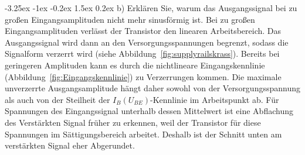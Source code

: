 \documentclass[
	a4paper, %
	12pt, %
]{CSUniSchoolLabReport}
\makeatletter
\renewcommand\paragraph{\@startsection{paragraph}{4}{\z@}%
  {-3.25ex \@plus -1ex \@minus -0.2ex}%
  {1.5ex \@plus 0.2ex}%
  {\normalfont\normalsize\bfseries}}
\makeatother
\begin{document}
\paragraph{b) Erklären Sie, warum das Ausgangssignal bei zu großen Eingangsamplituden nicht mehr sinusförmig ist.}
Bei zu großen Eingangsamplituden verlässt der Transistor den linearen Arbeitsbereich. Das Ausgangssignal wird dann an den Versorgungsspannungen begrenzt, sodass die Signalform verzerrt wird (siehe Abbildung~\ref{fig:supplyrailskrass}). Bereits bei geringeren Amplituden kann es durch die nichtlineare Eingangskennlinie (Abbildung~\ref{fig:Eingangskennlinie}) zu Verzerrungen kommen. Die maximale unverzerrte Ausgangsamplitude hängt daher sowohl von der Versorgungsspannung als auch von der Steilheit der $I_B(U_{BE})$-Kennlinie im Arbeitspunkt ab.  
Für Spannungen des Eingangssignal unterhalb dessen Mittelwert ist eine Abflachung des Verstärkten Signal früher zu erkennen, weil der Transistor für diese Spannungen im Sättigungsbereich arbeitet. Deshalb ist der Schnitt unten am verstärkten Signal eher Abgerundet. 
\end{document}
